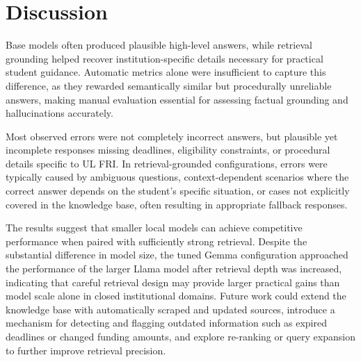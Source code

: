 \documentclass[fleqn,moreauthors,10pt]{ds_report}
\begin{document}
\section*{Discussion}

Base models often produced plausible high-level answers, while
retrieval grounding helped recover institution-specific details
necessary for practical student guidance. Automatic metrics alone
were insufficient to capture this difference, as they rewarded
semantically similar but procedurally unreliable answers, making
manual evaluation essential for assessing factual grounding and
hallucinations accurately.

Most observed errors were not completely incorrect answers, but
plausible yet incomplete responses missing deadlines, eligibility
constraints, or procedural details specific to UL FRI. In
retrieval-grounded configurations, errors were typically caused by
ambiguous questions, context-dependent scenarios where the correct
answer depends on the student's specific situation, or cases not
explicitly covered in the knowledge base, often resulting in
appropriate fallback responses.

The results suggest that smaller local models can achieve competitive
performance when paired with sufficiently strong retrieval. Despite
the substantial difference in model size, the tuned Gemma
configuration approached the performance of the larger Llama model
after retrieval depth was increased, indicating that careful retrieval
design may provide larger practical gains than model scale alone in
closed institutional domains. Future work could extend the knowledge base with automatically
scraped and updated sources, introduce a mechanism for detecting
and flagging outdated information such as expired deadlines or
changed funding amounts, and explore re-ranking or query expansion
to further improve retrieval precision.



\end{document}
